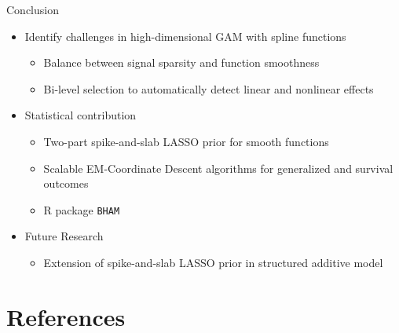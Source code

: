 \documentclass[
  ignorenonframetext,
  aspectratio=169]{beamer}
\providecommand{\tightlist}{%
  \setlength{\itemsep}{0pt}\setlength{\parskip}{0pt}}
\begin{document}
\begin{frame}[fragile]{Conclusion}
\begin{itemize}
\tightlist
\item
  Identify challenges in high-dimensional GAM with spline functions

  \begin{itemize}
  \tightlist
  \item
    Balance between signal sparsity and function smoothness
  \item
    Bi-level selection to automatically detect linear and nonlinear
    effects
  \end{itemize}
\item
  Statistical contribution

  \begin{itemize}
  \tightlist
  \item
    Two-part spike-and-slab LASSO prior for smooth functions
  \item
    Scalable EM-Coordinate Descent algorithms for generalized and
    survival outcomes
  \item
    R package \texttt{BHAM}
  \end{itemize}
\item
  Future Research

  \begin{itemize}
  \tightlist
  \item
    Extension of spike-and-slab LASSO prior in structured additive model
  \end{itemize}
\end{itemize}
\end{frame}

\hypertarget{references}{%
\section*{References}\label{references}}
\end{document}
